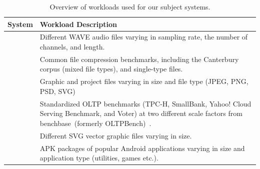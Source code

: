 \begin{table}
	\footnotesize
	\centering
	\caption{Overview of workloads used for our subject systems.}
	\begin{tabular}{lp{7cm}}
		\toprule
		\textbf{System} & \textbf{Workload Description} \\
		\midrule
		
		\jumper & Different WAVE audio files varying in sampling rate, the number of channels, and length. \\
		
		\midrule
		\kanzi  & Common file compression benchmarks, including the Canterbury corpus (mixed file types), and single-type files. \\
		
		\midrule
		\dconvert  & Graphic and project files varying in size and file type (JPEG, PNG, PSD, SVG) \\
		
		\midrule
		\htwo & Standardized OLTP benchmarks (TPC-H, SmallBank, Yahoo! Cloud Serving Benchmark, and Voter) at two different scale factors from \textsf{benchbase}~(formerly \textsf{OLTPBench})~\cite{difallah_oltp_2013}. \\
		
		\midrule
		\batik  & Different SVG vector graphic files varying in size. \\
		
		\midrule
		\jadx  & APK packages of popular Android applications varying in size and application type (utilities, games etc.). \\
		\bottomrule
	\end{tabular}
\label{tab:workloads}
\end{table}

